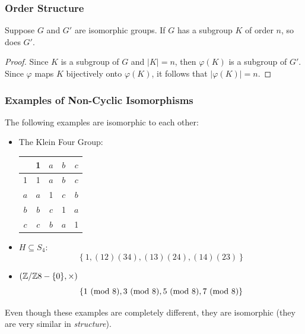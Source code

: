 \documentclass[letterpaper]{article}
\begin{document}
\subsubsection{Order Structure}
\begin{mdframed}
    \begin{proposition}
        Suppose $G$ and $G'$ are isomorphic groups. If $G$ has a subgroup $K$ of order $n$, so does $G'$.
    \end{proposition}
\end{mdframed}

\begin{mdframed}
    \begin{proof}
        Since $K$ is a subgroup of $G$ and $|K| = n$, then $\varphi(K)$ is a subgroup of $G'$. Since $\varphi$ maps $K$ bijectively onto $\varphi(K)$, it follows that $|\varphi(K)| = n$. 
    \end{proof}
\end{mdframed}


\subsubsection{Examples of Non-Cyclic Isomorphisms}
The following examples are isomorphic to each other: 
\begin{itemize}
    \item The Klein Four Group: 
    \begin{center}
        \begin{tabular}{c|c c c c}
                & 1 & $a$ & $b$ & $c$ \\ 
            \hline 
            1   & 1 & $a$ & $b$ & $c$ \\ 
            $a$ & $a$ & 1 & $c$ & $b$ \\ 
            $b$ & $b$ & $c$ & 1 & $a$ \\ 
            $c$ & $c$ & $b$ & $a$ & 1
        \end{tabular}
    \end{center}

    \item $H \subseteq S_4$: 
    \[\left\{1, (12)(34), (13)(24), (14)(23)\right\}\]

    \item $(\mathbb{Z} / \mathbb{Z} 8 - \{0\}, \times)$
    \[\{1 \ (\mathrm{mod}\ 8), 3 \ (\mathrm{mod}\ 8), 5 \ (\mathrm{mod}\ 8), 7 \ (\mathrm{mod}\ 8)\}\]
\end{itemize}
Even though these examples are completely different, they are isomorphic (they are very similar in \emph{structure}). 
\end{document}
